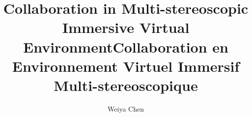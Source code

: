 \documentclass[logos]{orsay-thesis}  %
\author{Weiya Chen}
\title[english]{Collaboration in Multi-stereoscopic Immersive Virtual Environment}
\title[french]{Collaboration en Environnement Virtuel Immersif Multi-stereoscopique}
\begin{document}

\pagestyle{empty}

\dominitoc %

\iffalse
\pagebreak\strut
\newpage
\chapter*{Acknowledgement}

\clearpage

\chapter*{}
\thispagestyle{empty}
\textit{\hfill The spring silk worm \newline \null\hfill will weave its thread until it dies;\newline\newline \null\hfill The wax candle \newline \null\hfill will shed tears until it turns to ashes. \newline\newline \null\hfill - To my family}
\fi


\chapter*{}





\end{document}
